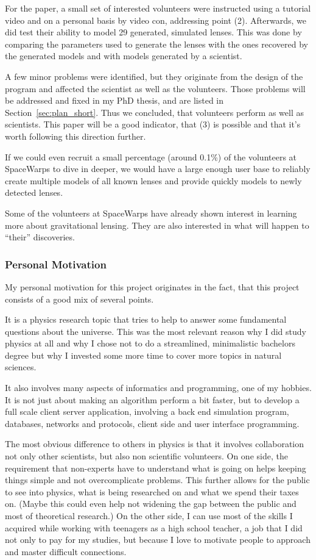 \documentclass[11pt]{article}
\begin{document}
For the paper, a small set of interested volunteers were instructed using a tutorial video and on a personal basis by video con, addressing point (2).
Afterwards, we did test their ability to model 29 generated, simulated lenses.
This was done by comparing the parameters used to generate the lenses with the ones recovered by the generated models and with models generated by a scientist.

A few minor problems were identified, but they originate from the design of the program and affected the scientist as well as the volunteers.
Those problems will be addressed and fixed in my PhD thesis, and are listed in Section~\ref{sec:plan_short}.
Thus we concluded, that volunteers perform as well as scientists.
This paper will be a good indicator, that (3) is possible and that it's worth following this direction further.


If we could even recruit a small percentage (around 0.1\%) of the volunteers at SpaceWarps to dive in deeper, we would have a large enough user base to reliably create multiple models of all known lenses and provide quickly models to newly detected lenses.

Some of the volunteers at SpaceWarps have already shown interest in learning more about gravitational lensing.
They are also interested in what will happen to ``their'' discoveries.



\subsubsection{Personal Motivation}

My personal motivation for this project originates in the fact, that this project consists of a good mix of several points.

It is a physics research topic that tries to help to answer some fundamental questions about the universe.
This was the most relevant reason why I did study physics at all and why I chose not to do a streamlined, minimalistic bachelors degree but why I invested some more time to cover more topics in natural sciences.

It also involves many aspects of informatics and programming, one of my hobbies.
It is not just about making an algorithm perform a bit faster, but to develop a full scale client server application, involving a back end simulation program, databases, networks and protocols, client side and user interface programming.

The most obvious difference to others in physics is that it involves collaboration not only other scientists, but also non scientific volunteers.
On one side, the requirement that non-experts have to understand what is going on helps keeping things simple and not overcomplicate problems.
This further allows for the public to see into physics, what is being researched on and what we spend their taxes on.
(Maybe this could even help not widening the gap between the public and most of theoretical research.)
On the other side, I can use most of the skills I acquired while working with teenagers as a high school teacher, a job that I did not only to pay for my studies, but because I love to motivate people to approach and master difficult connections.
\end{document}
